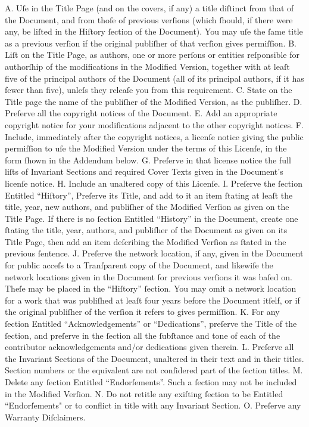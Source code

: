 A. Uſe in the Title Page (and on the covers, if any) a title diſtinct
   from that of the Document, and from thoſe of previous verſions
   (which ſhould, if there were any, be liſted in the Hiſtory ſection
   of the Document). You may uſe the ſame title as a previous verſion
   if the original publiſher of that verſion gives permiſſion.
B. Liſt on the Title Page, as authors, one or more perſons or entities
   reſponsible for authorſhip of the modifications in the Modified
   Version, together with at leaſt five of the principal authors of the
   Document (all of its principal authors, if it has fewer than five),
   unleſs they releaſe you from this requirement.
C. State on the Title page the name of the publiſher of the
   Modified Version, as the publiſher.
D. Preſerve all the copyright notices of the Document.
E. Add an appropriate copyright notice for your modifications
   adjacent to the other copyright notices.
F. Include, immediately after the copyright notices, a licenſe notice
   giving the public permiſſion to uſe the Modified Version under the
   terms of this Licenſe, in the form ſhown in the Addendum below.
G. Preſerve in that license notice the full liſts of Invariant Sections
   and required Cover Texts given in the Document’s licenſe notice.
H. Include an unaltered copy of this Licenſe.
I. Preſerve the ſection Entitled “Hiſtory”, Preſerve its Title, and add
   to it an item ſtating at leaſt the title, year, new authors, and
   publiſher of the Modified Verſion as given on the Title Page. If
   there is no ſection Entitled “History” in the Document, create one
   ſtating the title, year, authors, and publiſher of the Document as
   given on its Title Page, then add an item deſcribing the Modified
   Verſion as ſtated in the previous ſentence.
J. Preſerve the network location, if any, given in the Document for
   public acceſs to a Tranſparent copy of the Document, and likewiſe
   the network locations given in the Document for previous verſions
   it was baſed on. Theſe may be placed in the “Hiſtory” ſection.
   You may omit a network location for a work that was publiſhed at
   leaſt four years before the Document itſelf, or if the original
   publiſher of the verſion it refers to gives permiſſion.
K. For any ſection Entitled “Acknowledgements” or “Dedications”,
   preſerve the Title of the ſection, and preſerve in the ſection all
   the ſubſtance and tone of each of the contributor acknowledgements
   and/or dedications given therein.
L. Preſerve all the Invariant Sections of the Document,
   unaltered in their text and in their titles. Section numbers
   or the equivalent are not conſidered part of the ſection titles.
M. Delete any ſection Entitled “Endorſements”. Such a ſection
   may not be included in the Modified Verſion.
N. Do not retitle any exiſting ſection to be Entitled “Endorſements"
   or to conflict in title with any Invariant Section.
O. Preſerve any Warranty Diſclaimers.

